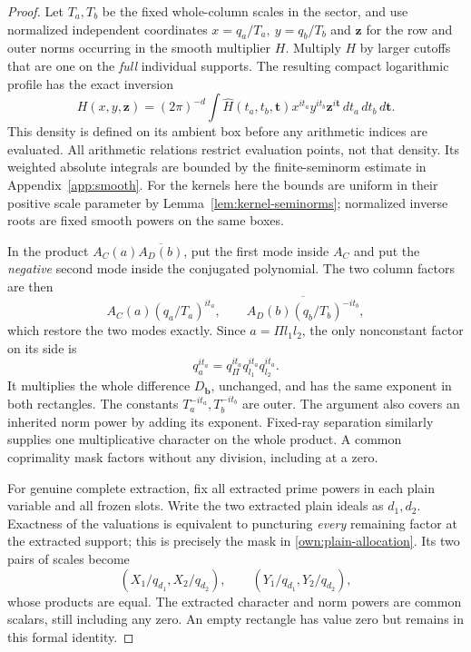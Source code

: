 \documentclass[12pt]{article}
\begin{document}
\begin{proof}
Let \(T_a,T_b\) be the fixed whole-column scales in the sector,
and use normalized independent coordinates
\(x=q_a/T_a,\ y=q_b/T_b\) and \(\boldsymbol z\) for the row and
outer norms occurring in the smooth multiplier \(H\).
Multiply \(H\) by larger cutoffs that are one on the \emph{full}
individual supports.  The resulting compact logarithmic profile
has the exact inversion
\[
 H(x,y,\boldsymbol z)
  =(2\pi)^{-d}\int
       \widehat H(t_a,t_b,\boldsymbol t)
       x^{it_a}y^{it_b}\boldsymbol z^{i\boldsymbol t}
             \,dt_a\,dt_b\,d\boldsymbol t .
\]
This density is defined on its ambient box before any arithmetic
indices are evaluated.  All arithmetic relations restrict evaluation
points, not that density.  Its weighted absolute integrals are
bounded by the finite-seminorm estimate in
Appendix~\ref{app:smooth}.  For the kernels here the bounds are uniform
in their positive scale parameter by
Lemma~\ref{lem:kernel-seminorms}; normalized inverse roots are fixed
smooth powers on the same boxes.

In the product \(A_C(a)\overline{A_D(b)}\), put the first mode
inside \(A_C\) and put the \emph{negative} second mode inside the
conjugated polynomial.  The two column factors are then
\[
 A_C(a)(q_a/T_a)^{it_a},\qquad
 \overline{A_D(b)(q_b/T_b)^{-it_b}},
\]
which restore the two modes exactly.  Since \(a=\Pi l_1l_2\),
the only nonconstant factor on its side is
\[
 q_a^{it_a}=q_\Pi^{it_a}q_{l_1}^{it_a}q_{l_2}^{it_a}.
\]
It multiplies the whole difference \(D_{\mathbf b}\), unchanged,
and has the same exponent in both rectangles.  The constants
\(T_a^{-it_a},T_b^{-it_b}\) are outer.  The argument also covers
an inherited norm power by adding its exponent.  Fixed-ray
separation similarly supplies one multiplicative character on the
whole product.  A common coprimality mask factors without any
division, including at a zero.

For genuine complete extraction, fix all extracted prime powers
in each plain variable and all frozen slots.  Write the two
extracted plain ideals as \(d_1,d_2\).  Exactness of the valuations
is equivalent to puncturing \emph{every} remaining factor at the
extracted support; this is precisely the mask in
\eqref{own:plain-allocation}.  Its two pairs of scales become
\[
 (X_1/q_{d_1},X_2/q_{d_2}),\qquad
 (Y_1/q_{d_1},Y_2/q_{d_2}),
\]
whose products are equal.  The extracted character and norm powers
are common scalars, still including any zero.  An empty rectangle
has value zero but remains in this formal identity.


\end{proof}
\end{document}
